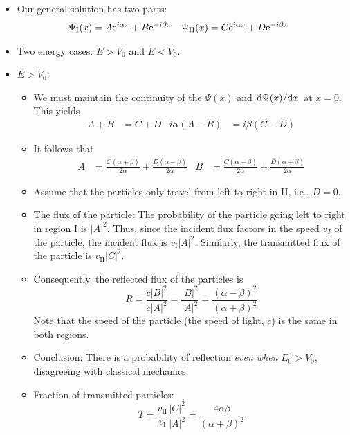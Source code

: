 \documentclass[../notes.tex]{subfiles}
\begin{document}
\begin{itemize}
\begin{itemize}
        \item Our general solution has two parts:
        \begin{align*}
            \Psi_\text{I}(x)  &= A\e[i\alpha x]+B\e[-i\beta x]&
            \Psi_\text{II}(x) &= C\e[i\alpha x]+D\e[-i\beta x]
        \end{align*}
        \item Two energy cases: $E>V_0$ and $E<V_0$.
        \item $E>V_0$:
        \begin{itemize}
            \item We must maintain the continuity of the $\Psi(x)$ and $\dv*{\Psi(x)}{x}$ at $x=0$. This yields
            \begin{align*}
                A+B &= C+D&
                i\alpha(A-B) &= i\beta(C-D)
            \end{align*}
            \item It follows that
            \begin{align*}
                A &= \frac{C(\alpha+\beta)}{2\alpha}+\frac{D(\alpha-\beta)}{2\alpha}&
                B &= \frac{C(\alpha-\beta)}{2\alpha}+\frac{D(\alpha+\beta)}{2\alpha}
            \end{align*}
            \item Assume that the particles only travel from left to right in II, i.e., $D=0$.
            \item The flux of the particle: The probability of the particle going left to right in region I is $|A|^2$. Thus, since the incident flux factors in the speed $v_I$ of the particle, the incident flux is $v_\text{I}|A|^2$. Similarly, the transmitted flux of the particle is $v_\text{II}|C|^2$.
            \item Consequently, the reflected flux of the particles is
            \begin{equation*}
                R = \frac{c|B|^2}{c|A|^2} = \frac{|B|^2}{|A|^2} = \frac{(\alpha-\beta)^2}{(\alpha+\beta)^2}
            \end{equation*}
            Note that the speed of the particle (the speed of light, $c$) is the same in both regions.
            \item Conclusion: There is a probability of reflection \emph{even when} $E_0>V_0$, disagreeing with classical mechanics.
            \item Fraction of transmitted particles:
            \begin{equation*}
                T = \frac{v_\text{II}}{v_\text{I}}\frac{|C|^2}{|A|^2} = \frac{4\alpha\beta}{(\alpha+\beta)^2}

\end{equation*}
\end{itemize}
\end{itemize}
\end{itemize}
\end{document}
